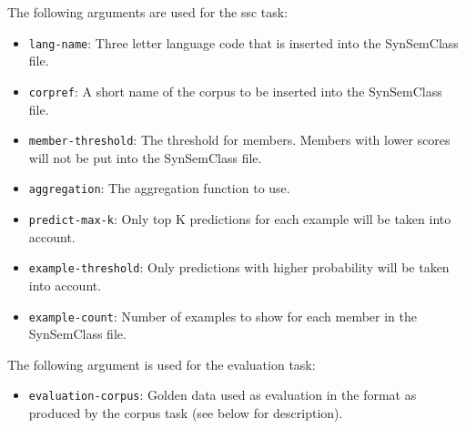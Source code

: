 \noindent
The following arguments are used for the ssc task:
\begin{itemize}
    \item \texttt{lang-name}: Three letter language code that is inserted into the SynSemClass file.
    \item \texttt{corpref}: A short name of the corpus to be inserted into the SynSemClass file.
    \item \texttt{member-threshold}: The threshold for members. Members with lower scores will not be put into the SynSemClass file.
    \item \texttt{aggregation}: The aggregation function to use.
    \item \texttt{predict-max-k}: Only top K predictions for each example will be taken into account.
    \item \texttt{example-threshold}: Only predictions with higher probability will be taken into account.
    \item \texttt{example-count}: Number of examples to show for each member in the SynSemClass file.
\end{itemize}


\noindent
The following argument is used for the evaluation task:
\begin{itemize}
    \item \texttt{evaluation-corpus}: Golden data used as evaluation in the format as produced by the corpus task (see below for description).
\end{itemize}

